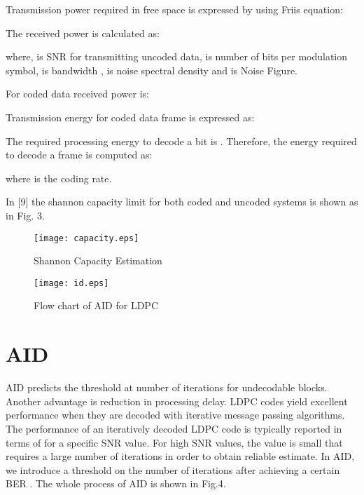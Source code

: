 \documentclass[3p,times,procedia]{elsarticle}
\begin{document}
Transmission power required in free space is expressed by using Friis equation:
\vspace{-0.5cm}




The received power is calculated as:
\vspace{-0.5cm}

where,  is SNR for transmitting uncoded data,  is number of bits per modulation symbol,  is bandwidth ,
is noise spectral density and  is Noise Figure.


For coded data received power is:
\vspace{-0.5cm}

Transmission energy for coded data frame is expressed as:
\vspace{-0.4cm}

The required processing energy to decode a bit is . Therefore, the energy required to decode a frame  is computed as:
\vspace{-0.5cm}

where  is the coding rate.


In [9] the shannon capacity limit for both coded and uncoded systems is shown as in Fig. 3.


  \begin{figure}[!ht]
    \begin{minipage}{0.49\linewidth}
\texttt{[image: capacity.eps]}
\caption{Shannon Capacity Estimation}
    \end{minipage}
\hspace{0.1cm}
    \begin{minipage}{0.49\linewidth}
\texttt{[image: id.eps]}
\vspace{-0.5cm}
\caption{Flow chart of AID for LDPC}
    \end{minipage}
  \end{figure}

\vspace{-1.3cm}
\section{AID}
\vspace{-0.3cm}


 AID predicts the threshold at number of iterations for undecodable blocks. Another advantage is reduction in processing delay. LDPC codes yield excellent performance when they are decoded with iterative message passing algorithms. The performance of an iteratively decoded LDPC code is typically reported in terms of  for a specific SNR value. For high SNR values, the value  is small that requires a large number of iterations in order to obtain reliable estimate. In AID, we introduce a threshold on the number of iterations after achieving a certain BER . The whole process of AID is shown in Fig.4.
\end{document}
